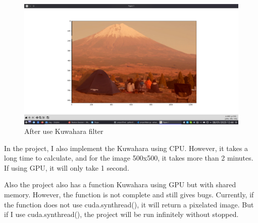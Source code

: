 \documentclass{article}
\begin{document}
\begin{figure}
    \centering
    \includegraphics[width= \textwidth]{images/yuruResult.png}
    \caption{After use Kuwahara filter}
    \label{fig:figure6}
\end{figure}

\pagebreak

In the project, I also implement the Kuwahara using CPU. However, it takes a long time to calculate, and for the image 500x500, it takes more than 2 minutes. If using GPU, it will only take 1 second.

Also the project also has a function Kuwahara using GPU but with shared memory. However, the function is not complete and still gives bugs. Currently, if the function does not use cuda.synthread(), it will return a pixelated image. But if I use cuda.synthread(), the project will be run infinitely without stopped. 
\end{document}

